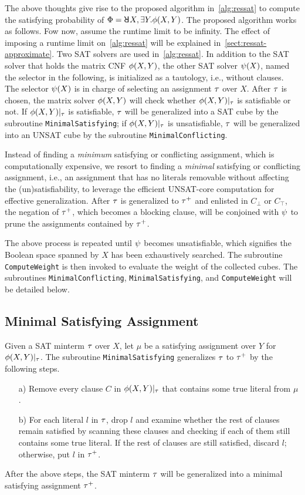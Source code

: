 The above thoughts give rise to the proposed algorithm in~\cref{alg:ressat} to compute the satisfying probability of $\Qf=\random{} X,\exists Y.\pf(X,Y)$.
The proposed algorithm works as follows.
Fow now, assume the runtime limit \timeout to be infinity.
The effect of imposing a runtime limit on~\cref{alg:ressat} will be explained in~\cref{sect:ressat-approximate}.
Two SAT solvers are used in~\cref{alg:ressat}.
In addition to the SAT solver that holds the matrix CNF $\phi(X,Y)$,
the other SAT solver $\psi(X)$, named the selector in the following,
is initialized as a tautology, i.e., without clauses.
The selector $\psi(X)$ is in charge of selecting an assignment $\tau$ over $X$.
After $\tau$ is chosen, the matrix solver $\phi(X,Y)$ will check whether $\phi(X,Y)|_{\tau}$ is satisfiable or not.
If $\phi(X,Y)|_{\tau}$ is satisfiable,
$\tau$ will be generalized into a SAT cube by the subroutine \texttt{MinimalSatisfying};
if $\phi(X,Y)|_{\tau}$ is unsatisfiable,
$\tau$ will be generalized into an UNSAT cube by the subroutine \texttt{MinimalConflicting}.

Instead of finding a \textit{minimum} satisfying or conflicting assignment,
which is computationally expensive,
we resort to finding a \textit{minimal} satisfying or conflicting assignment,
i.e., an assignment that has no literals removable without affecting the (un)satisfiability,
to leverage the efficient UNSAT-core computation for effective generalization.
After $\tau$ is generalized to $\tau^+$ and enlisted in $C_\bot$ or $C_\top$,
the negation of $\tau^+$, which becomes a blocking clause,
will be conjoined with $\psi$ to prune the assignments contained by $\tau^+$.

The above process is repeated until $\psi$ becomes unsatisfiable,
which signifies the Boolean space spanned by $X$ has been exhaustively searched.
The subroutine \texttt{ComputeWeight} is then invoked to evaluate the weight of the collected cubes.
The subroutines \texttt{MinimalConflicting}, \texttt{MinimalSatisfying}, and \texttt{ComputeWeight} will be detailed below.

\subsection{Minimal Satisfying Assignment}
Given a SAT minterm $\tau$ over $X$,
let $\mu$ be a satisfying assignment over $Y$ for $\phi(X,Y)|_{\tau}$.
The subroutine \texttt{MinimalSatisfying} generalizes $\tau$ to $\tau^+$ by the following steps.
\begin{itemize}
    \item[a)] Remove every clause $C$ in $\phi(X,Y)|_{\tau}$ that contains some true literal from $\mu$.
    \item[b)] For each literal $l$ in $\tau$, drop $l$ and examine whether the rest of clauses remain satisfied
          by scanning these clauses and checking if each of them still contains some true literal.
          If the rest of clauses are still satisfied, discard $l$; otherwise, put $l$ in $\tau^+$.
\end{itemize}
After the above steps, the SAT minterm $\tau$ will be generalized into a minimal satisfying assignment $\tau^+$.

